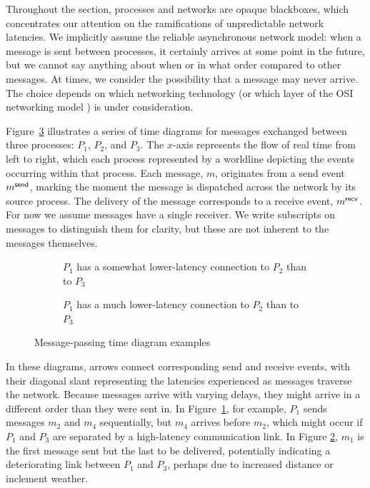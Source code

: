 \documentclass[]             %
{NASA}                       %
\theoremstyle{definition}
\begin{document}
Throughout the section, processes and networks are opaque blackboxes,
which concentrates our attention on the ramifications of unpredictable
network latencies. We implicitly assume the reliable asynchronous
network model: when a message is sent between processes, it certainly
arrives at some point in the future, but we cannot say anything about
when or in what order compared to other messages. At times, we
consider the possibility that a message may never arrive. The choice
depends on which networking technology (or which layer of the OSI
networking model \cite{1983:osi-reference-model}) is under
consideration.

Figure~\ref{fig:message-latencies} illustrates a series of time
diagrams for messages exchanged between three processes: $P_1$, $P_2$,
and $P_3$. The $x$-axis represents the flow of real time from left to
right, which each process represented by a worldline depicting the
events occurring within that process. Each message, $m$, originates
from a send event $m_{}^{\mathsf{send}}$, marking the moment the message is
dispatched across the network by its source process. The delivery of
the message corresponds to a receive event, $m_{}^{\mathsf{recv}}$. For now we
assume messages have a single receiver. We write subscripts on
messages to distinguish them for clarity, but these are not inherent
to the messages themselves.

\begin{figure}[p]
  \setlength\belowcaptionskip{5ex}
  \begin{subfigure}{1\textwidth}
    \centering
    
    \caption{$P_1$ has a somewhat lower-latency connection to $P_2$ than to $P_3$}
    \label{fig:message-latencies-a}
  \end{subfigure}
  \begin{subfigure}{1\textwidth}
    \centering 
    \caption{$P_1$ has a much lower-latency connection to $P_2$ than to $P_3$}
    \label{fig:message-latencies-b}
  \end{subfigure}
  \caption{Message-passing time diagram examples}
  \label{fig:message-latencies}
\end{figure}

In these diagrams, arrows connect corresponding send and receive
events, with their diagonal slant representing the latencies
experienced as messages traverse the network. Because messages arrive
with varying delays, they might arrive in a different order than they
were sent in. In Figure~\ref{fig:message-latencies-a}, for example,
$P_1$ sends messages $m_2$ and $m_4$ sequentially, but $m_4$ arrives
before $m_2$, which might occur if $P_1$ and $P_3$ are separated by a
high-latency communication link. In Figure
\ref{fig:message-latencies-b}, $m_1$ is the first message sent but the
last to be delivered, potentially indicating a deteriorating link
between $P_1$ and $P_3$, perhaps due to increased distance or
inclement weather.
\end{document}
